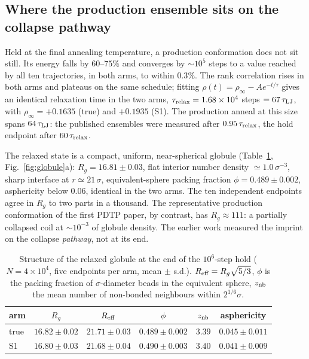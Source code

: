 \documentclass[reprint,amsmath,amssymb,aps,pre,longbibliography]{revtex4-2}
\begin{document}
\subsection{Where the production ensemble sits on the collapse pathway}

Held at the final annealing temperature, a production conformation does not sit still. Its
energy falls by $60$--$75\%$ and converges by $\sim\!10^{5}$ steps to a value reached by all
ten trajectories, in both arms, to within $0.3\%$. The rank correlation rises in both arms
and plateaus on the same schedule; fitting $\rho(t)=\rho_\infty-Ae^{-t/\tau}$ gives an
identical relaxation time in the two arms,
$\tau_{\rm relax}=1.68\times10^{4}$ steps $=67\,\tau_{\rm LJ}$, with $\rho_\infty=+0.1635$
(true) and $+0.1935$ (S1). The production anneal at this size spans $64\,\tau_{\rm LJ}$: the
published ensembles were measured after $0.95\,\tau_{\rm relax}$, the hold endpoint after
$60\,\tau_{\rm relax}$.

The relaxed state is a compact, uniform, near-spherical globule (Table~\ref{tab:globule},
Fig.~\ref{fig:globule}a): $R_g=16.81\pm0.03$, flat interior number density
$\simeq1.0\,\sigma^{-3}$, sharp interface at $r\simeq21\,\sigma$, equivalent-sphere packing
fraction $\phi=0.489\pm0.002$, asphericity below $0.06$, identical in the two arms. The ten
independent endpoints agree in $R_g$ to two parts in a thousand. The representative
production conformation of the first PDTP paper, by contrast, has $R_g\approx111$: a
partially collapsed coil at $\sim10^{-3}$ of globule density. The earlier work measured the
imprint on the collapse \emph{pathway}, not at its end.

\begin{table}[b]
\caption{Structure of the relaxed globule at the end of the $10^{6}$-step hold
($N=4\times10^{4}$, five endpoints per arm, mean $\pm$ s.d.). $R_{\rm eff}=R_g\sqrt{5/3}$,
$\phi$ is the packing fraction of $\sigma$-diameter beads in the equivalent sphere,
$z_{\rm nb}$ the mean number of non-bonded neighbours within $2^{1/6}\sigma$.}
\label{tab:globule}
\footnotesize
\begin{ruledtabular}
\begin{tabular}{lccccc}
arm & $R_g$ & $R_{\rm eff}$ & $\phi$ & $z_{\rm nb}$ & asphericity\\ \hline
true & $16.82\pm0.02$ & $21.71\pm0.03$ & $0.489\pm0.002$ & $3.39$ & $0.045\pm0.011$\\
S1   & $16.80\pm0.03$ & $21.68\pm0.04$ & $0.490\pm0.003$ & $3.40$ & $0.041\pm0.009$\\
\end{tabular}
\end{ruledtabular}
\end{table}
\end{document}

